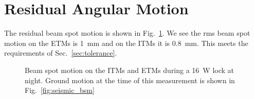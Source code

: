 



\section{Residual Angular Motion}
The residual beam spot motion is shown in Fig.~\ref{fig:bsm}. We see
the rms beam spot motion on the ETMs is 1~mm and on the ITMs it is
0.8~mm. This meets the requirements of Sec.~\ref{sec:tolerance}.

\begin{figure}
\begin{centering}
\caption[Beam spot motion on the ITMs and ETMs during a 16~W
lock]{Beam spot motion on the ITMs and ETMs during a 16~W lock at
  night. Ground motion at the time of this measurement is shown in
  Fig.~\ref{fig:seismic_bsm}}%
\label{fig:bsm}
\end{centering}
\end{figure}


